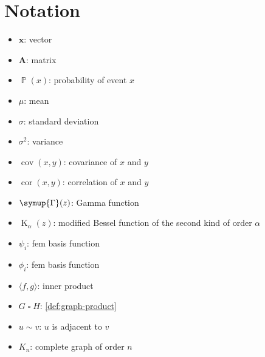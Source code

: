 \documentclass[british]{scrreprt}
\DeclareMathOperator{\prob}{\mathbb{P}}
\DeclareMathOperator{\cov}{cov}
\DeclareMathOperator{\cor}{cor}
\DeclareMathOperator{\BesselK}{K}
\newcommand{\graphprod}{\mathbin{\square}}
\newcommand{\adj}{\mathbin{\sim}}
\begin{document}
\chapter{Notation}
\label{ch:notation}
\begin{itemize}
    \item \( \symbf{x} \): vector
    \item \( \symbf{A} \): matrix
    \item \( \prob(x) \): probability of event \( x \)
    \item \( \mu \): mean
    \item \( \sigma \): standard deviation
    \item \( \sigma^{2} \): variance
    \item \( \cov(x, y) \): covariance of \( x \) and \( y \)
    \item \( \cor(x, y) \): correlation of \( x \) and \( y \)
    \item \( \symup{\Gamma}(z) \): Gamma function
    \item \( \BesselK_{\alpha}(z) \): modified Bessel function of the second kind of order \( \alpha \)
    \item \( \psi_{i} \): \gls{fem} basis function
    \item \( \phi_{i} \): \gls{fem} basis function
    \item \( \langle f, g \rangle \): inner product
    \item \( G \graphprod H \): \cref{def:graph-product}
    \item \( u \adj v \): \( u \) is adjacent to \( v \)
    \item \( K_{n} \): complete graph of order \( n \)
\end{itemize}

\clearpage
{}
{}

\end{document}
